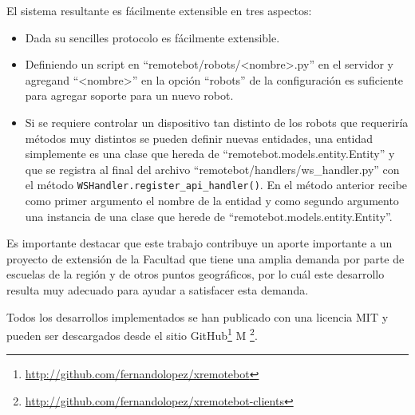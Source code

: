El sistema resultante es fácilmente extensible en tres aspectos:
\begin{itemize}
    \item Dada su sencilles protocolo es fácilmente extensible.
    \item Definiendo un script en ``remotebot/robots/<nombre>.py''
en el servidor y agregand ``<nombre>'' en la opción ``robots''
de la configuración es suficiente para agregar soporte
para un nuevo robot.
    \item Si se requiere controlar un dispositivo tan distinto de los
        robots que requeriría métodos muy distintos se pueden definir
        nuevas entidades, una entidad simplemente es una clase que
        hereda de ``remotebot.models.entity.Entity'' y que se
        registra al final del archivo ``remotebot/handlers/ws\_handler.py''
        con el método \texttt{WSHandler.register\_api\_handler()}.
        En el método anterior recibe como primer argumento el
        nombre de la entidad y como segundo argumento una instancia
        de una clase que herede de ``remotebot.models.entity.Entity''.
\end{itemize}

Es importante destacar que este trabajo contribuye un aporte importante a
un proyecto de extensión de la Facultad que tiene una amplia demanda
por parte de escuelas de la región y de otros puntos geográficos, por
lo cuál este desarrollo resulta muy adecuado para ayudar a satisfacer
esta demanda.

Todos los desarrollos implementados se han publicado con una licencia
MIT y pueden ser descargados desde el sitio
GitHub\footnote{\url{http://github.com/fernandolopez/xremotebot}}%
M
\footnote{\url{http://github.com/fernandolopez/xremotebot-clients}}.
